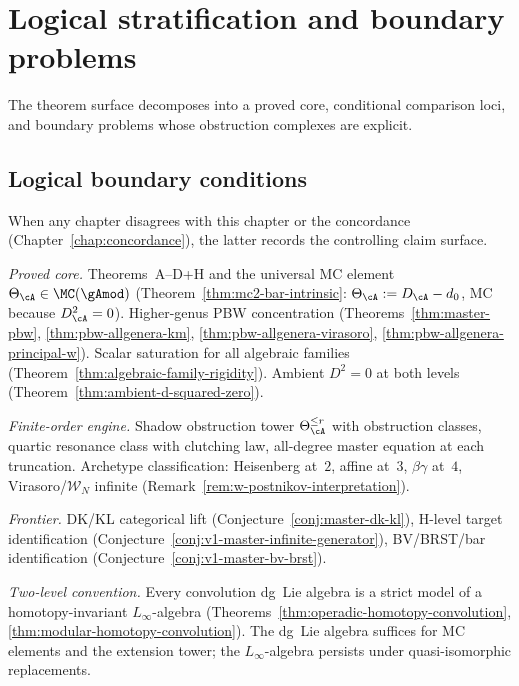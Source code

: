 \chapter{Logical stratification and boundary problems}
\label{chap:editorial-constitution}


The theorem surface decomposes into a proved core, conditional
comparison loci, and boundary problems whose obstruction complexes are
explicit.

\section{Logical boundary conditions}
\label{sec:constitutional-declaration}

\begin{remark}\label{rem:constitutional}
When any chapter disagrees with this chapter or the concordance
(Chapter~\ref{chap:concordance}), the latter records the controlling
claim surface.

\smallskip\noindent
\emph{Proved core.}\enspace
Theorems~A--D+H and the universal MC element
$\Theta_\cA \in \MC(\gAmod)$
(Theorem~\ref{thm:mc2-bar-intrinsic}:
$\Theta_\cA := D_\cA - d_0$, MC because $D_\cA^2 = 0$).
Higher-genus PBW concentration
(Theorems~\ref{thm:master-pbw},
\ref{thm:pbw-allgenera-km},
\ref{thm:pbw-allgenera-virasoro},
\ref{thm:pbw-allgenera-principal-w}).
Scalar saturation for all algebraic families
(Theorem~\ref{thm:algebraic-family-rigidity}).
Ambient $D^2 = 0$ at both levels
(Theorem~\ref{thm:ambient-d-squared-zero}).

\smallskip\noindent
\emph{Finite-order engine.}\enspace
Shadow obstruction tower $\Theta_\cA^{\leq r}$ with
obstruction classes, quartic resonance class with clutching law,
all-degree master equation at each truncation.
Archetype classification: Heisenberg at~$2$,
affine at~$3$, $\beta\gamma$ at~$4$,
Virasoro/$\mathcal{W}_N$ infinite
(Remark~\ref{rem:w-postnikov-interpretation}).

\smallskip\noindent
\emph{Frontier.}\enspace
DK/KL categorical lift
(Conjecture~\ref{conj:master-dk-kl}),
H-level target identification
(Conjecture~\ref{conj:v1-master-infinite-generator}),
BV/BRST/bar identification
(Conjecture~\ref{conj:v1-master-bv-brst}).

\smallskip\noindent
\emph{Two-level convention.}\enspace
Every convolution dg~Lie algebra is a strict
model of a homotopy-invariant $L_\infty$-algebra
(Theorems~\ref{thm:operadic-homotopy-convolution},
\ref{thm:modular-homotopy-convolution}).
The dg~Lie algebra suffices for MC elements and the
extension tower; the $L_\infty$-algebra persists under
quasi-isomorphic replacements.
\end{remark}


